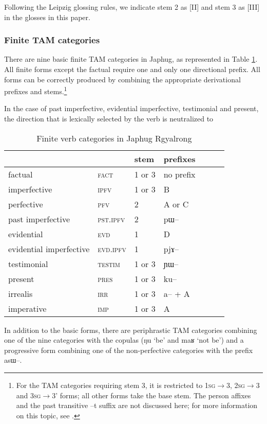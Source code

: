 \documentclass[oldfontcommands,oneside,a4paper,11pt]{article}
\newcommand{\ipa}[1]{{\phon \mbox{#1}}} %
\begin{document}
Following the Leipzig glossing rules, we indicate stem 2 as [II] and stem 3 as [III] in the glosses in this paper.
\subsubsection{Finite TAM categories} \label{sec:finite.TAM}
There are nine basic finite TAM categories in Japhug, as represented in Table \ref{tab:finite.forms}. All finite forms except the factual require one and only one directional prefix. All forms can be correctly produced by combining the appropriate derivational prefixes and stems.\footnote{For the TAM categories requiring stem 3, it is restricted to  \textsc{1sg}$\rightarrow$3, \textsc{2sg}$\rightarrow$3 and \textsc{3sg}$\rightarrow$3' forms; all other forms take the base stem.  The person affixes and the past transitive \ipa{--t} suffix are not discussed here; for  more information on this topic, see \citet{jacques10inverse}.}


In the case of past imperfective, evidential imperfective, testimonial and present, the direction that is lexically selected by the verb is neutralized to 

\begin{table}
\caption{Finite verb categories in Japhug Rgyalrong} \label{tab:finite.forms} \centering
\begin{tabular}{lllllll}
\toprule
&	&	stem&	prefixes\\
\midrule
factual&	\textsc{fact} &	1 or 3&	no prefix\\
imperfective&	\textsc{ipfv} &	1 or 3&	B\\
perfective&	\textsc{pfv} &	2&	A or C\\
past imperfective&	\textsc{pst.ipfv} &	2&	\ipa{pɯ--}\\
evidential&	\textsc{evd} &	1&	D\\
evidential imperfective&	\textsc{evd.ipfv} &	1&	\ipa{pjɤ--}\\
testimonial&	\textsc{testim} &	1 or 3&	\ipa{ɲɯ--}\\
present&	\textsc{pres} &	1 or 3&	\ipa{ku--}\\
irrealis&	\textsc{irr} &	1 or 3&	\ipa{a--} + A\\
imperative&	\textsc{imp} &	1 or 3&	A\\
\bottomrule
\end{tabular}
\end{table}

In addition to the basic forms, there are periphrastic TAM categories combining one of the nine categories with the copulas (\ipa{ŋu} `be' and \ipa{maʁ} `not be') and a progressive form combining one of the non-perfective categories with the prefix \ipa{asɯ}--.
\end{document}
